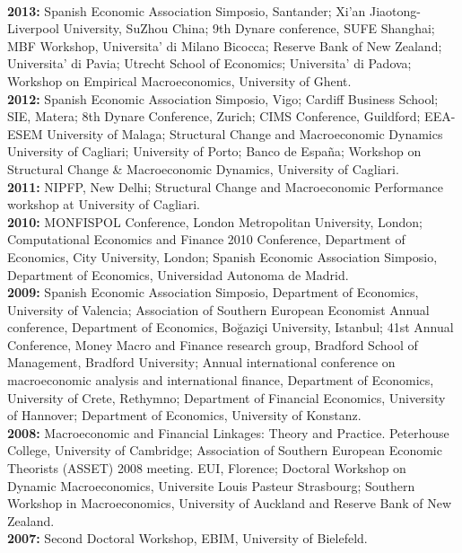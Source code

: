 \documentclass[margin, 11pt]{res} %
\begin{document}
\begin{resume}
\\
\textbf{2013:} {Spanish Economic Association Simposio, Santander; Xi'an Jiaotong-Liverpool University, SuZhou China; 9th Dynare conference, SUFE Shanghai; MBF Workshop, Universita' di Milano Bicocca; Reserve Bank of New Zealand; Universita' di Pavia; Utrecht School of Economics; Universita' di Padova; Workshop on Empirical Macroeconomics, University of Ghent.}
\\
\textbf{2012:} {Spanish Economic Association Simposio, Vigo; Cardiff Business School; SIE, Matera; 8th Dynare Conference, Zurich; CIMS Conference, Guildford; EEA-ESEM University of Malaga; Structural Change and Macroeconomic Dynamics University of Cagliari; University of Porto; Banco de Espa\~{n}a; Workshop on Structural Change \& Macroeconomic Dynamics, University of Cagliari.}
\\
\textbf{2011:} {NIPFP, New Delhi; Structural Change and Macroeconomic Performance workshop at University of 
Cagliari.}
\\
\textbf{2010:} {MONFISPOL Conference, London Metropolitan University, London; Computational Economics and Finance 2010 Conference, Department of Economics,  City University, London; Spanish Economic Association Simposio, Department of Economics,  Universidad Autonoma de Madrid. }
\\
\textbf{2009:} {Spanish Economic Association Simposio, Department of Economics,  University of Valencia; Association of Southern European Economist Annual conference, Department of Economics, Bo\u{g}azi\c{c}i University, Istanbul; 41st Annual Conference, Money Macro and Finance research group, Bradford School of Management, Bradford University; Annual international conference on macroeconomic analysis and international finance, Department of Economics, University of Crete, Rethymno; Department of Financial Economics, University of Hannover; Department of Economics, University of Konstanz.}
\\
\textbf{2008:} {Macroeconomic and Financial Linkages: Theory and Practice. Peterhouse College, University of Cambridge; Association of Southern European Economic Theorists (ASSET) 2008 meeting. EUI, Florence; Doctoral Workshop on Dynamic Macroeconomics, Universite Louis Pasteur Strasbourg; Southern Workshop in Macroeconomics, University of Auckland and Reserve Bank of New Zealand.}
\\
\textbf{2007:} {Second Doctoral Workshop, EBIM, University of Bielefeld.}



\end{resume}
\end{document}
